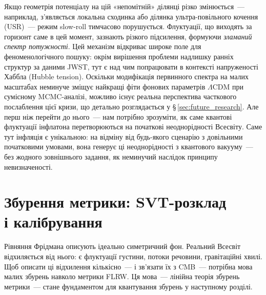 \documentclass[12pt, a4paper]{article}
\begin{document}
Якщо геометрія потенціалу на цій «непомітній» ділянці різко
змінюється~--- наприклад, з'являється локальна сходинка або ділянка
ультра-повільного кочення (USR)~--- режим slow-roll тимчасово
порушується. Флуктуації, що виходять за горизонт саме в цей момент,
зазнають різкого підсилення, формуючи \emph{зламаний спектр
потужності}. Цей механізм відкриває широке поле для феноменологічного
пошуку: окрім вирішення проблеми надлишку ранніх структур за даними JWST,
тут є над чим попрацювати в контексті напруженості Хаббла (Hubble tension).
Оскільки модифікація первинного спектра на малих масштабах неминуче
зміщує найкращі фіти фонових параметрів $\Lambda$CDM при сумісному MCMC-аналізі,
можливо існує реальна перспектива часткового послаблення цієї кризи, що
детально розглядається у §\,\ref{sec:future_research}. Але перш ніж перейти
до нього~--- нам потрібно зрозуміти, як саме квантові флуктуації
інфлатона перетворюються на початкові неоднорідності Всесвіту.
Саме тут інфляція є унікальною: на відміну від будь-якого
сценарію з довільними початковими умовами, вона генерує ці
неоднорідності з квантового вакууму~--- без жодного зовнішнього
задання, як неминучий наслідок принципу невизначеності.


\section{Збурення метрики: SVT-розклад\\ і калібрування}
\label{sec:metric}

Рівняння Фрідмана описують ідеально симетричний фон.
Реальний Всесвіт відхиляється від нього: є флуктуації густини,
потоки речовини, гравітаційні хвилі. Щоб описати ці відхилення
кількісно~--- і зв'язати їх з CMB~--- потрібна мова малих збурень
навколо метрики FLRW. Ця мова~--- лінійна теорія збурень метрики~---
стане фундаментом для квантування збурень у наступному розділі.
\end{document}
